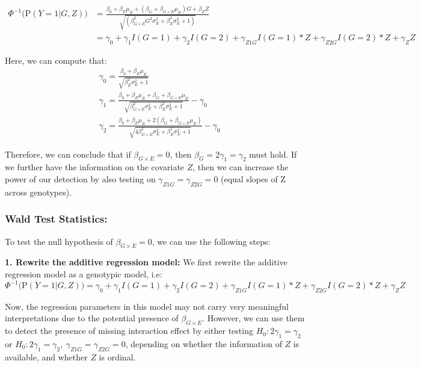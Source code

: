 \documentclass[
]{article}
\begin{document}
\begin{equation}
\begin{aligned}
\Phi^{-1} \bigg(\text{P}(Y = 1 | G, Z) \bigg) &= \frac{\beta_0+\beta_E \mu_E+(\beta_G + \beta_{G\times E} \mu_E)G + \beta_Z Z}{\sqrt{(\beta_{G\times E}^2 G^2 \sigma_E^2 + \beta_E^2 \sigma_E^2 + 1)}} \\
                                              &= \gamma_0 + \gamma_1 I(G = 1) + \gamma_2 I(G=2) + \gamma_{Z1G} I(G=1) * Z + \gamma_{Z2G} I(G=2) * Z + \gamma_Z Z 
\end{aligned}
\end{equation}

Here, we can compute that: \begin{equation}
\begin{aligned}
& \gamma_0 = \frac{\beta_0 + \beta_E \mu_E}{\sqrt{\beta_E^2 \sigma_E^2 + 1}} \\
& \gamma_1 = \frac{\beta_0 + \beta_E \mu_E + \beta_G + \beta_{G\times E} \mu_E}{\sqrt{\beta_{G\times E}^2 \sigma_E^2 + \beta_E^2 \sigma_E^2 + 1}} - \gamma_0 \\
& \gamma_2 = \frac{\beta_0 + \beta_E \mu_E + 2(\beta_G + \beta_{G\times E} \mu_E)}{\sqrt{4\beta_{G\times E}^2 \sigma_E^2 + \beta_E^2 \sigma_E^2 + 1}} - \gamma_0
\end{aligned}
\end{equation}

Therefore, we can conclude that if \(\beta_{G\times E} = 0\), then
\(\beta_G =2\gamma_1 = \gamma_2\) must hold. If we further have the
information on the covariate \(Z\), then we can increase the power of
our detection by also testing on \(\gamma_{Z1G} = \gamma_{Z2G} =0\)
(equal slopes of Z across genotypes).

\hypertarget{wald-test-statistics}{%
\subsubsection{Wald Test Statistics:}\label{wald-test-statistics}}

To test the null hypothesis of \(\beta_{G\times E} = 0\), we can use the
following steps:

\textbf{1. Rewrite the additive regression model:} We first rewrite the
additive regression model as a genotypic model, i.e:
\[\Phi^{-1} \bigg(\text{P}(Y = 1 | G, Z) \bigg) = \gamma_0 + \gamma_1 I(G = 1) + \gamma_2 I(G=2) + \gamma_{Z1G} I(G=1) * Z + \gamma_{Z2G} I(G=2) * Z + \gamma_Z Z\]

Now, the regression parameters in this model may not carry very
meaningful interpretations due to the potential presence of
\(\beta_{G\times E}\). However, we can use them to detect the presence
of missing interaction effect by either testing
\(H_0: 2\gamma_1 = \gamma_2\) or
\(H_0: 2\gamma_1 = \gamma_2, \ \gamma_{Z1G}=\gamma_{Z2G} =0\), depending
on whether the information of \(Z\) is available, and whether \(Z\) is
ordinal.
\end{document}
